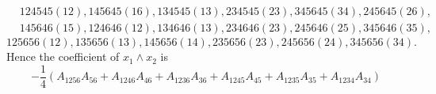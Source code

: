 \documentclass[aps, preprint]{revtex4}
\begin{document}
\begin{align*} & 124545 \left (12\right ) ,145645 \left (16\right ) ,134545 \left (13\right ) ,234545 \left (23\right ) ,345645 \left (34\right ) ,245645 \left (26\right )\text{,} \\
 & 145646 \left (15\right ) ,124646 \left (12\right ) ,134646 \left (13\right ) ,234646 \left (23\right ) ,245646 \left (25\right ) ,345646 \left (35\right )\text{,}\end{align*}
\begin{equation}125656 \left (12\right ) ,135656 \left (13\right ) ,145656 \left (14\right ) ,235656 \left (23\right ) ,245656 \left (24\right ) ,345656 \left (34\right )\text{.}
\end{equation}Hence the coefficient of $x_{1} \wedge x_{2}$ is
\begin{equation} -\frac{1}{4} \left (A_{1 2 5 6} A_{5 6} +A_{1 2 4 6} A_{4 6} +A_{1 2 3 6} A_{3 6} +A_{1 2 4 5} A_{4 5} +A_{1 2 3 5} A_{3 5} +A_{1 2 3 4} A_{3 4}\right )
\end{equation}
\end{document}
